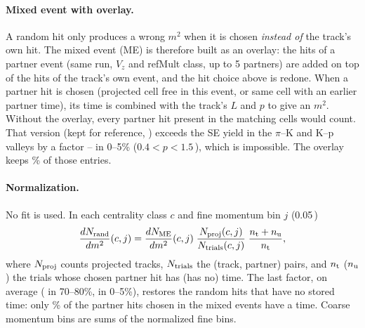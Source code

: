 \paragraph{Mixed event with overlay.} A random hit only produces a wrong $m^2$ when it is chosen \emph{instead of}
the track's own hit. The mixed event (ME) is therefore built as an overlay: the hits of a partner event (same run,
$V_z$ and refMult class, up to 5 partners) are added on top of the hits of the track's own event, and the hit choice
above is redone. When a partner hit is chosen (projected cell free in this event, or same cell with an earlier
partner time), its time is combined with the track's $L$ and $p$ to give an $m^2$. Without the overlay, every
partner hit present in the matching cells would count. That version (kept for reference, ) exceeds the
SE yield in the $\pi$--K and K--p valleys by a factor \mtValleyPlainMinVthree--\mtValleyPlainMaxVthree{} in 0--5\%
($0.4<p<1.5$\,\GeVc), which is impossible. The overlay keeps \mtShadowFracVthree\% of those entries.

\paragraph{Normalization.} No fit is used. In each centrality class $c$ and fine momentum bin $j$ (0.05\,\GeVc)
\begin{equation}
\frac{dN_{\rm rand}}{dm^2}(c,j) = \frac{dN_{\rm ME}}{dm^2}(c,j)\;\frac{N_{\rm proj}(c,j)}{N_{\rm trials}(c,j)}\;
\frac{n_{\rm t}+n_{\rm u}}{n_{\rm t}},
\end{equation}
where $N_{\rm proj}$ counts projected tracks, $N_{\rm trials}$ the (track, partner) pairs, and $n_{\rm t}$ ($n_{\rm u}$)
the trials whose chosen partner hit has (has no) time. The last factor, \mtTimedScaleAllVthree{} on average
(\mtTimedScaleCaVthree{} in 70--80\%, \mtTimedScaleCiVthree{} in 0--5\%), restores the random hits that have no stored
time: only \mtMETimedFracVthree\% of the partner hits chosen in the mixed events have a time.
Coarse momentum bins are sums of the normalized fine bins.


